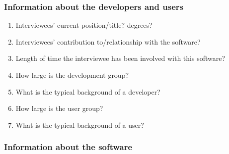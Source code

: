 \documentclass[letterpaper,cleveref]{lipics-v2019}
\theoremstyle{definition}
\begin{document}
\subsubsection{Information about the developers and users}
\begin{enumerate}
\item Interviewees' current position/title? degrees?
\item Interviewees' contribution to/relationship with the software?
\item Length of time the interviewee has been involved with this software?
\item How large is the development group?
\item What is the typical background of a developer?
\item How large is the user group?
\item What is the typical background of a user?
\end{enumerate}

\subsubsection{Information about the software}
\end{document}
